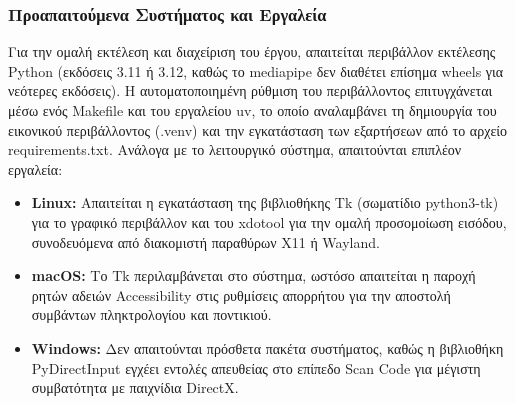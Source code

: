 \documentclass[twoside, a4paper, 11pt]{article}
\newcommand{\textlatin}[1]{\textenglish{#1}}
\begin{document}
\subsubsection{Προαπαιτούμενα Συστήματος και Εργαλεία}
Για την ομαλή εκτέλεση και διαχείριση του έργου, απαιτείται περιβάλλον εκτέλεσης Python (εκδόσεις \textlatin{3.11} ή \textlatin{3.12}, καθώς το \textlatin{mediapipe} δεν διαθέτει επίσημα \textlatin{wheels} για νεότερες εκδόσεις). Η αυτοματοποιημένη ρύθμιση του περιβάλλοντος επιτυγχάνεται μέσω ενός \textlatin{Makefile} και του εργαλείου \textlatin{uv}, το οποίο αναλαμβάνει τη δημιουργία του εικονικού περιβάλλοντος (\textlatin{.venv}) και την εγκατάσταση των εξαρτήσεων από το αρχείο \textlatin{requirements.txt}. 
Ανάλογα με το λειτουργικό σύστημα, απαιτούνται επιπλέον εργαλεία:
\begin{itemize}
    \item \textbf{Linux:} Απαιτείται η εγκατάσταση της βιβλιοθήκης \textlatin{Tk} (σωματίδιο \textlatin{python3-tk}) για το γραφικό περιβάλλον και του \textlatin{xdotool} για την ομαλή προσομοίωση εισόδου, συνοδευόμενα από διακομιστή παραθύρων X11 ή Wayland.
    \item \textbf{macOS:} Το \textlatin{Tk} περιλαμβάνεται στο σύστημα, ωστόσο απαιτείται η παροχή ρητών αδειών \textlatin{Accessibility} στις ρυθμίσεις απορρήτου για την αποστολή συμβάντων πληκτρολογίου και ποντικιού.
    \item \textbf{Windows:} Δεν απαιτούνται πρόσθετα πακέτα συστήματος, καθώς η βιβλιοθήκη \textlatin{PyDirectInput} εγχέει εντολές απευθείας στο επίπεδο \textlatin{Scan Code} για μέγιστη συμβατότητα με παιχνίδια DirectX.
\end{itemize}
\end{document}
